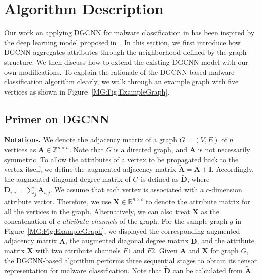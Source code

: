 \section{Algorithm Description}
\label{MG:Sec:DGCNN}

Our work on applying DGCNN for malware classification in \sysname has been inspired by the deep learning model proposed in~\cite{Dgcnn}. In this section, we first introduce how DGCNN aggregates attributes through the neighborhood defined by the graph structure. We then discuss how to extend the existing DGCNN model with our own modifications. To explain the rationale of the DGCNN-based malware classification algorithm clearly, we walk through an example graph with five vertices as shown in Figure~\ref{MG:Fig:ExampleGraph}.

\subsection{Primer on DGCNN}

\textbf{Notations.} We denote the adjacency matrix of a graph $G=(V, E)$ of $n$ vertices as $\mathbf{A} \in \mathbb{Z} ^{n\times n}$.
Note that $G$ is a directed graph, and $\mathbf{A}$ is not necessarily symmetric.
To allow the attributes of a vertex to be propagated back to the vertex itself, we define the augmented adjacency matrix $\tilde{\mathbf{A}} = \mathbf{A} + \mathbf{I}$.
Accordingly, the augmented diagonal degree matrix of $G$ is defined as $\tilde{\mathbf{D}}$, where
$\tilde{\mathbf{D}}_{i,i} = \sum_j \tilde{\mathbf{A}}_{i,j}$.
We assume that each vertex is associated with a $c$-dimension attribute vector.
Therefore, we use $\mathbf{X} \in \mathbb{R}^{n \times c}$ to denote the attribute matrix for all the vertices in the graph. %
Alternatively, we can also treat $\mathbf{X}$ as the concatenation of $c$ \textit{attribute channels} of the graph.
For the sample graph $g$ in Figure~\ref{MG:Fig:ExampleGraph}, we displayed the corresponding augmented adjacency matrix $\tilde{\mathbf{A}}$, the augmented diagonal degree matrix $\tilde{\mathbf{D}}$, and the attribute matrix $\mathbf{X}$ with two attribute channels $F1$ and $F2$.
Given $\tilde{\mathbf{A}}$ and $\mathbf{X}$ for graph $G$, the DGCNN-based algorithm performs three sequential stages to obtain its tensor representation for malware classification. Note that $\tilde{\mathbf{D}}$ can be calculated from $\tilde{\mathbf{A}}$.


